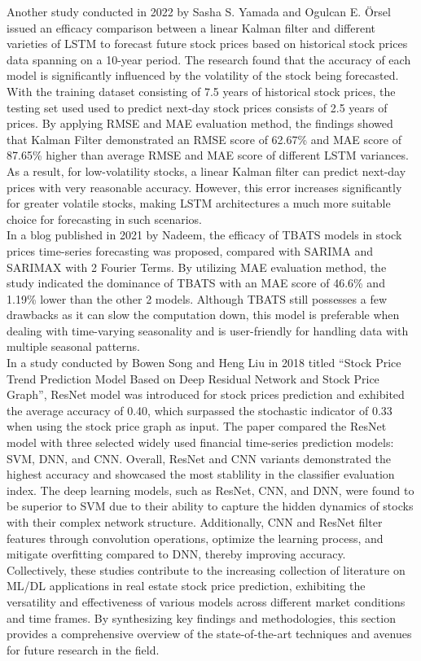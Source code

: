 \documentclass{ieeeojies}
\begin{document}
Another study conducted in 2022 by Sasha S. Yamada and Ogulcan E. Örsel issued an efficacy comparison between a linear Kalman filter and different varieties of LSTM to forecast future stock prices based on historical stock prices data spanning on a 10-year period. The research found that the accuracy of each model is significantly influenced by the volatility of the stock being forecasted. With the training dataset consisting of 7.5 years of historical stock prices, the testing set used used to predict next-day stock prices consists of 2.5 years of prices. By applying RMSE and MAE evaluation method, the findings showed that Kalman Filter demonstrated an RMSE score of 62.67\% and MAE score of 87.65\% higher than average RMSE and MAE score of different LSTM variances. As a result, for low-volatility stocks, a linear Kalman filter can predict next-day prices with very reasonable accuracy. However, this error increases significantly for greater volatile stocks, making LSTM architectures a much more suitable choice for forecasting in such scenarios.\\
In a blog published in 2021 by Nadeem, the efficacy of TBATS models in stock prices time-series forecasting was proposed, compared with SARIMA and SARIMAX with 2 Fourier Terms. By utilizing MAE evaluation method, the study indicated the dominance of TBATS with an MAE score of 46.6\% and 1.19\% lower than the other 2 models. Although TBATS still possesses a few drawbacks as it can slow the computation down, this model is preferable when dealing with time-varying seasonality and is user-friendly for handling data with multiple seasonal patterns.\\
In a study conducted by Bowen Song and Heng Liu in 2018 titled “Stock Price Trend Prediction Model Based on Deep Residual Network and Stock Price Graph”, ResNet model was introduced for stock prices prediction and exhibited the average accuracy of 0.40, which surpassed the stochastic indicator of 0.33 when using the stock price graph as input. The paper compared the ResNet model with three selected widely used financial time-series prediction models: SVM, DNN, and CNN. Overall, ResNet and CNN variants demonstrated the highest accuracy and showcased the most stablility in the classifier evaluation index. The deep learning models, such as ResNet, CNN, and DNN, were found to be superior to SVM due to their ability to capture the hidden dynamics of stocks with their complex network structure. Additionally, CNN and ResNet filter features through convolution operations, optimize the learning process, and mitigate overfitting compared to DNN, thereby improving accuracy.\\
Collectively, these studies contribute to the increasing collection of literature on ML/DL applications in real estate stock price prediction, exhibiting the versatility and effectiveness of various models across different market conditions and time frames. By synthesizing key findings and methodologies, this section provides a comprehensive overview of the state-of-the-art techniques and avenues for future research in the field.
\end{document}
